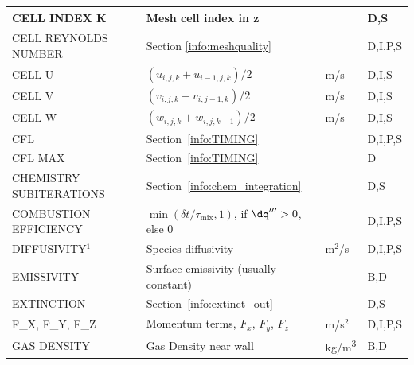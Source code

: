 \documentclass[11pt]{book}
\begin{document}
\begin{longtable}{@{\extracolsep{\fill}}|l|l|l|l|}
{\ct CELL INDEX K}                              & Mesh cell index in z                              &                & D,S          \\ \hline
{\ct CELL REYNOLDS NUMBER}                      & Section \ref{info:meshquality}                    &                & D,I,P,S      \\ \hline
{\ct CELL U}                                    & $(u_{i,j,k}+u_{i-1,j,k})/2$                       & m/s            & D,I,S        \\ \hline
{\ct CELL V}                                    & $(v_{i,j,k}+v_{i,j-1,k})/2$                       & m/s            & D,I,S        \\ \hline
{\ct CELL W}                                    & $(w_{i,j,k}+w_{i,j,k-1})/2$                       & m/s            & D,I,S        \\ \hline
{\ct CFL}                                       & Section~\ref{info:TIMING}                         &                & D,I,P,S      \\ \hline
{\ct CFL MAX}                                   & Section~\ref{info:TIMING}                         &                & D            \\ \hline
{\ct CHEMISTRY SUBITERATIONS}                   & Section~\ref{info:chem_integration}               &                & D,S          \\ \hline
{\ct COMBUSTION EFFICIENCY}                     & $\min(\delta t/\tau_{\mathrm{mix}},1)$, if $\dq'''>0$, else 0 &    & D,I,P,S      \\ \hline
{\ct DIFFUSIVITY}$^1$                           & Species diffusivity                               & m$^2$/s        & D,I,P,S      \\ \hline
{\ct EMISSIVITY}                                & Surface emissivity (usually constant)             &                & B,D          \\ \hline
{\ct EXTINCTION}                                & Section~\ref{info:extinct_out}                    &                & D,S          \\ \hline
{\ct F\_X, F\_Y, F\_Z}                          & Momentum terms, $F_x$, $F_y$, $F_z$               & m/s$^2$        & D,I,P,S      \\ \hline
{\ct GAS DENSITY}                               & Gas Density near wall                             & \si{kg/m^3}    & B,D          \\ \hline

\end{longtable}
\end{document}
